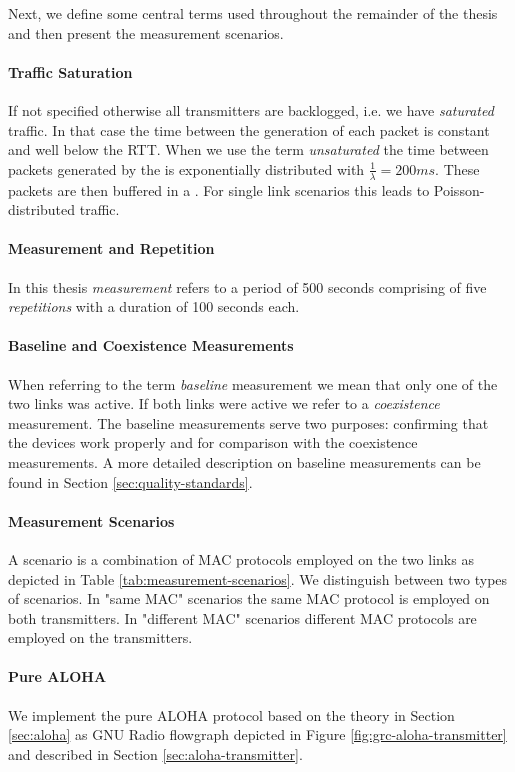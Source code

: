 Next, we define some central terms used throughout the remainder of the thesis and then present the measurement scenarios.

\paragraph{Traffic Saturation}
If not specified otherwise all transmitters are backlogged, i.e. we have \emph{saturated} traffic. In that case the time between the generation of each packet is constant and well below the RTT. When we use the term \emph{unsaturated} the time between packets generated by the  is exponentially distributed with $\frac{1}{\lambda}=200ms$. These packets are then buffered in a . For single link scenarios this leads to Poisson-distributed traffic.

\paragraph{Measurement and Repetition}
In this thesis \emph{measurement} refers to a period of 500 seconds comprising of five \emph{repetitions} with a duration of 100 seconds each. 

\paragraph{Baseline and Coexistence Measurements}
When referring to the term \emph{baseline} measurement we mean that only one of the two links was active. If both links were active we refer to a \emph{coexistence} measurement. The baseline measurements serve two purposes: confirming that the devices work properly and for comparison with the coexistence measurements. A more detailed description on baseline measurements can be found in Section \ref{sec:quality-standards}.   

\paragraph{Measurement Scenarios}
A scenario is a combination of  MAC protocols employed on the two links as depicted in Table \ref{tab:measurement-scenarios}. We distinguish between two types of scenarios. In "same MAC" scenarios the same MAC protocol is employed on both transmitters. In "different MAC" scenarios different MAC protocols are employed on the transmitters.

\paragraph{Pure ALOHA}
We implement the pure ALOHA protocol based on the theory in Section \ref{sec:aloha} as GNU Radio flowgraph depicted in Figure \ref{fig:grc-aloha-transmitter} and described in Section \ref{sec:aloha-transmitter}.

